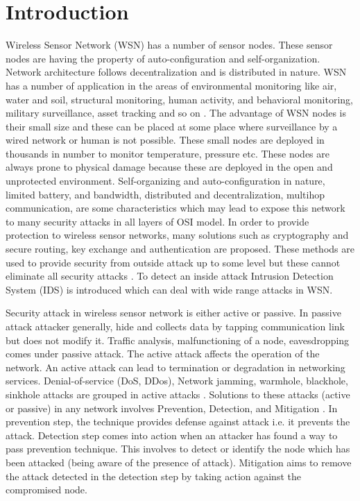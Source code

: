 \documentclass{svproc}
\begin{document}
\section{Introduction}
%
Wireless Sensor Network (WSN) has a number of sensor nodes. These sensor nodes are having the property of auto-configuration and self-organization. Network architecture follows decentralization and is distributed in nature. WSN has a number of application in the areas of environmental monitoring like air, water and soil, structural monitoring, human activity, and behavioral monitoring, military surveillance, asset tracking and so on \cite{akyildiz2002wireless}. The advantage of WSN nodes is their small size and these can be placed at some place where surveillance by a wired network or human is not possible. These small nodes are deployed in thousands in number to monitor temperature, pressure etc. These nodes are always prone to physical damage because these are deployed in the open and unprotected environment. Self-organizing and auto-configuration in nature, limited battery, and bandwidth, distributed and decentralization, multihop communication, are some characteristics which may lead to expose this network to many security attacks in all layers of OSI model. In order to provide protection to wireless sensor networks, many solutions such as cryptography and secure routing, key exchange and authentication are proposed. These methods are used to provide security from outside attack up to some level but these cannot eliminate all security attacks \cite{ping2008distributed}. To detect an inside attack Intrusion Detection System (IDS) is introduced which can deal with wide range attacks in WSN.\par
Security attack in wireless sensor network is either active or passive. In passive attack attacker generally, hide and collects data by tapping communication link but does not modify it. Traffic analysis, malfunctioning of a node, eavesdropping comes under passive attack. The active attack affects the operation of the network. An active attack can lead to termination or degradation in networking services. Denial-of-service (DoS, DDos), Network jamming, warmhole, blackhole, sinkhole attacks are grouped in active attacks \cite{padmavathi2009survey}. Solutions to these attacks (active or passive) in any network involves Prevention, Detection, and Mitigation \cite{fuchsberger2005intrusion}. In prevention step, the technique provides defense against attack i.e. it prevents the attack. Detection step comes into action when an attacker has found a way to pass prevention technique. This involves to detect or identify the node which has been attacked (being aware of the presence of attack). Mitigation aims to remove the attack detected in the detection step by taking action against the compromised node.\par
\end{document}
